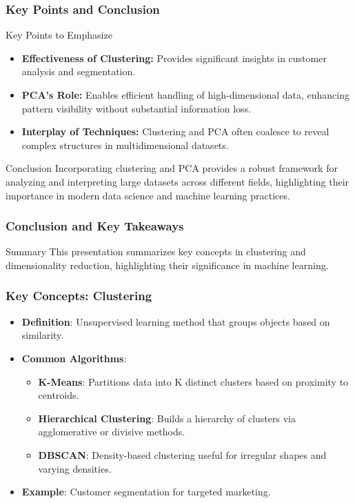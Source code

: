 \documentclass[aspectratio=169]{beamer}
\begin{document}
\begin{frame}[fragile]
    \frametitle{Key Points and Conclusion}
    \begin{block}{Key Points to Emphasize}
        \begin{itemize}
            \item \textbf{Effectiveness of Clustering:} Provides significant insights in customer analysis and segmentation.
            \item \textbf{PCA’s Role:} Enables efficient handling of high-dimensional data, enhancing pattern visibility without substantial information loss.
            \item \textbf{Interplay of Techniques:} Clustering and PCA often coalesce to reveal complex structures in multidimensional datasets.
        \end{itemize}
    \end{block}
    \begin{block}{Conclusion}
        Incorporating clustering and PCA provides a robust framework for analyzing and interpreting large datasets across different fields, highlighting their importance in modern data science and machine learning practices.
    \end{block}
\end{frame}

\begin{frame}[fragile]
    \frametitle{Conclusion and Key Takeaways}
    \begin{block}{Summary}
        This presentation summarizes key concepts in clustering and dimensionality reduction, highlighting their significance in machine learning.
    \end{block}
\end{frame}

\begin{frame}[fragile]
    \frametitle{Key Concepts: Clustering}
    \begin{itemize}
        \item \textbf{Definition}: Unsupervised learning method that groups objects based on similarity.
        \item \textbf{Common Algorithms}:
        \begin{itemize}
            \item \textbf{K-Means}: Partitions data into K distinct clusters based on proximity to centroids.
            \item \textbf{Hierarchical Clustering}: Builds a hierarchy of clusters via agglomerative or divisive methods.
            \item \textbf{DBSCAN}: Density-based clustering useful for irregular shapes and varying densities.
        \end{itemize}
        \item \textbf{Example}: Customer segmentation for targeted marketing.
    \end{itemize}
\end{frame}
\end{document}
